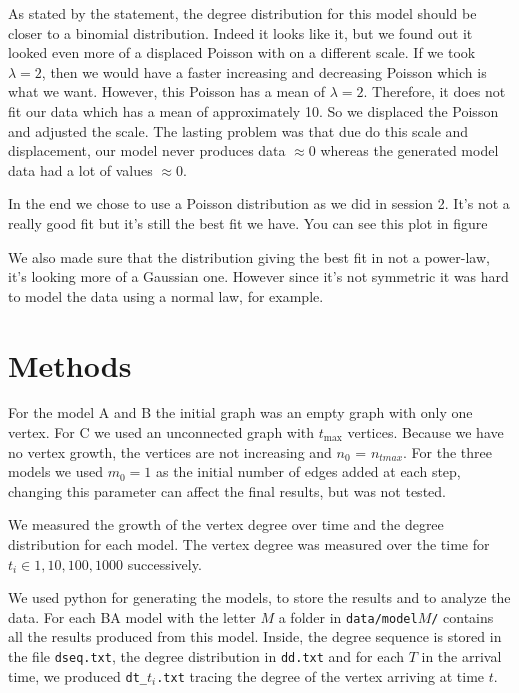 \documentclass[a4paper]{article}
\begin{document}
As stated by the statement, the degree distribution for this model should be
closer to a binomial distribution. Indeed it looks like it, but we found out it
looked even more of a displaced Poisson with on a different scale. If we took
$\lambda = 2$, then we would have a faster increasing and decreasing Poisson
which is what we want. However, this Poisson has a mean of $\lambda = 2$.
Therefore, it does not fit our data which has a mean of approximately 10.
So we displaced the Poisson and adjusted the scale. The lasting problem was that
due do this scale and displacement, our model never produces data $\approx 0$
whereas the generated model data had a lot of values $\approx 0$.

In the end we chose to use a Poisson distribution as we did in session 2. It's 
not a really good fit but it's still the best fit we have. You can see this plot 
in figure

We also made sure that the distribution giving the best fit in not a power-law, 
it's looking more of a Gaussian one. However since it's not symmetric it was 
hard to model the data using a normal law, for example.

\section{Methods} \label{methods}

For the model A and B the initial graph was an empty graph with only one vertex.  
For C we used an unconnected graph with $t_{\max}$ vertices.  Because we have no 
vertex growth, the vertices are not increasing and $n_0$ = $n_{tmax}$.  For the 
three models we used $m_0 = 1$ as the initial number of edges added at each 
step, changing this parameter can affect the final results, but was not tested.

We measured the growth of the vertex degree over time and the degree 
distribution for each model. The vertex degree was measured over the time for
$t_i \in {1, 10, 100, 1000}$ successively.

We used python for generating the models, to store the results and to analyze 
the data. For each BA model with the letter $M$ a folder in 
\texttt{data/model$M$/} contains all the results produced from this model. 
Inside, the degree sequence is stored in the file \texttt{dseq.txt}, the degree 
distribution in \texttt{dd.txt} and for each $T$ in the arrival time, we 
produced \texttt{dt\_$t_i$.txt} tracing the degree of the vertex arriving at 
time $t$.
\end{document}
